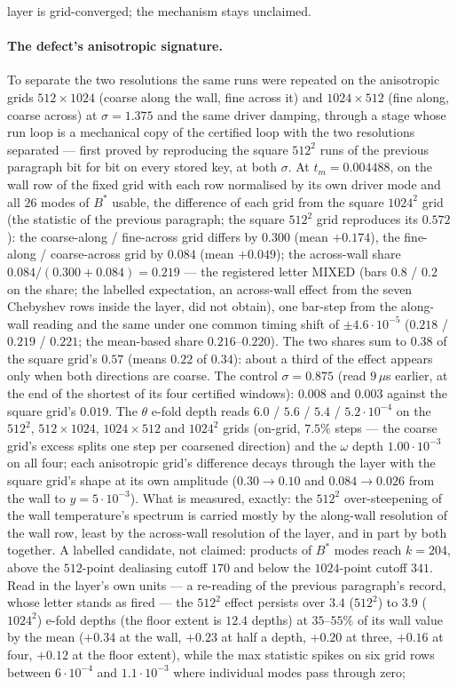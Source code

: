 \documentclass[11pt,a4paper]{article}
\newcommand{\tm}{t_m}
\newcommand{\Bst}{B^*}
\begin{document}
layer is grid-converged; the mechanism stays unclaimed.

\paragraph{The defect's anisotropic signature.} To separate the two resolutions the same runs were repeated on the anisotropic grids $512\times1024$ (coarse along the wall, fine across it) and $1024\times512$ (fine along, coarse across) at $\sigma=1.375$ and the same driver damping, through a stage whose run loop is a mechanical copy of the certified loop with the two resolutions separated --- first proved by reproducing the square $512^2$ runs of the previous paragraph bit for bit on every stored key, at both $\sigma$. At $\tm=0.004488$, on the wall row of the fixed grid with each row normalised by its own driver mode and all $26$ modes of $\Bst$ usable, the difference of each grid from the square $1024^2$ grid (the statistic of the previous paragraph; the square $512^2$ grid reproduces its $0.572$): the coarse-along / fine-across grid differs by $0.300$ (mean $+0.174$), the fine-along / coarse-across grid by $0.084$ (mean $+0.049$); the across-wall share $0.084/(0.300+0.084)=0.219$ --- the registered letter MIXED (bars $0.8$ / $0.2$ on the share; the labelled expectation, an across-wall effect from the seven Chebyshev rows inside the layer, did not obtain), one bar-step from the along-wall reading and the same under one common timing shift of $\pm4.6\cdot10^{-5}$ ($0.218$ / $0.219$ / $0.221$; the mean-based share $0.216$--$0.220$). The two shares sum to $0.38$ of the square grid's $0.57$ (means $0.22$ of $0.34$): about a third of the effect appears only when both directions are coarse. The control $\sigma=0.875$ (read $9\,\mu$s earlier, at the end of the shortest of its four certified windows): $0.008$ and $0.003$ against the square grid's $0.019$. The $\theta$ e-fold depth reads $6.0$ / $5.6$ / $5.4$ / $5.2\cdot10^{-4}$ on the $512^2$, $512\times1024$, $1024\times512$ and $1024^2$ grids (on-grid, $7.5\%$ steps --- the coarse grid's excess splits one step per coarsened direction) and the $\omega$ depth $1.00\cdot10^{-3}$ on all four; each anisotropic grid's difference decays through the layer with the square grid's shape at its own amplitude ($0.30\to0.10$ and $0.084\to0.026$ from the wall to $y=5\cdot10^{-3}$). What is measured, exactly: the $512^2$ over-steepening of the wall temperature's spectrum is carried mostly by the along-wall resolution of the wall row, least by the across-wall resolution of the layer, and in part by both together. A labelled candidate, not claimed: products of $\Bst$ modes reach $k=204$, above the $512$-point dealiasing cutoff $170$ and below the $1024$-point cutoff $341$. Read in the layer's own units --- a re-reading of the previous paragraph's record, whose letter stands as fired --- the $512^2$ effect persists over $3.4$ ($512^2$) to $3.9$ ($1024^2$) e-fold depths (the floor extent is $12.4$ depths) at $35$--$55\%$ of its wall value by the mean ($+0.34$ at the wall, $+0.23$ at half a depth, $+0.20$ at three, $+0.16$ at four, $+0.12$ at the floor extent), while the max statistic spikes on six grid rows between $6\cdot10^{-4}$ and $1.1\cdot10^{-3}$ where individual modes pass through zero; 
\end{document}
